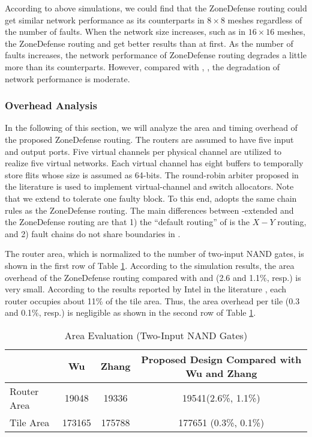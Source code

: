 According to above simulations, we could find that the ZoneDefense routing could get similar network performance as its counterparts in $8 \times 8$ meshes regardless of the number of faults. When the network size increases, such as in $16 \times 16$ meshes, the ZoneDefense routing and \cite{zhang2008reconfigurable} get better results than \cite{wu2003fault} at first. As the number of faults increases, the network performance of ZoneDefense routing degrades a little more than its counterparts. However, compared with \cite{wu2003fault}, \cite{zhang2008reconfigurable}, the degradation of network performance is moderate.

\subsubsection{Overhead Analysis}
In the following of this section, we will analyze the area and timing overhead of the proposed ZoneDefense routing. The routers are assumed to have five input and output ports. Five virtual channels per physical channel are utilized to realize five virtual networks. Each virtual channel has eight buffers to temporally store flits whose size is assumed as 64-bits. The round-robin arbiter proposed in the literature \cite{shin2002round} is used to implement virtual-channel and switch allocators. Note that we extend \cite{zhang2008reconfigurable} to tolerate one faulty block. To this end, \cite{zhang2008reconfigurable} adopts the same chain rules as the ZoneDefense routing. The main differences between \cite{zhang2008reconfigurable}-extended and the ZoneDefense routing are that 1) the “default routing” of \cite{zhang2008reconfigurable} is the $X-Y$ routing, and 2) fault chains do not share boundaries in \cite{zhang2008reconfigurable}.

The router area, which is normalized to the number of two-input NAND gates, is shown in the first row of Table \ref{tab:area-eval}. According to the simulation results, the area overhead of the ZoneDefense routing compared with \cite{wu2003fault} and \cite{zhang2008reconfigurable} (2.6 and 1.1\%, resp.) is very small. According to the results reported by Intel in the literature \cite{vangal200880}, each router occupies about 11\% of the tile area. Thus, the area overhead per tile (0.3 and 0.1\%, resp.) is negligible as shown in the second row of Table \ref{tab:area-eval}.

\begin{table}[h]
    \caption{Area Evaluation (Two-Input NAND Gates)}
    \setlength{\tabcolsep}{1mm}
    \begin{tabular}{@{}lccc} 
        \toprule
        & Wu \cite{wu2003fault}  & Zhang \cite{zhang2008reconfigurable} & Proposed Design Compared with Wu \cite{wu2003fault} and Zhang \cite{zhang2008reconfigurable} \\ 
        \midrule
                    Router Area & 19048  & 19336    & 19541(2.6\%, 1.1\%)   \\ 
                    Tile Area   & 173165 & 175788   & 177651 (0.3\%, 0.1\%) \\ 
                    \bottomrule                    
    \end{tabular}
    \label{tab:area-eval}
\end{table}

